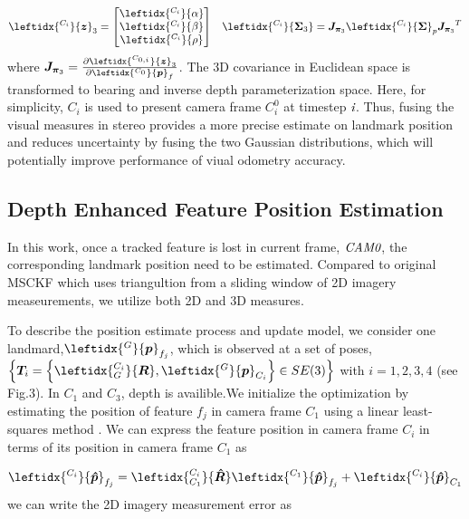\documentclass[a4paper, 10pt, conference]{ieeeconf}      %
\begin{document}
\begin{eqnarray}
\leftidx{^{C_{i}}}{ {\bm { z}}}_3 = \left[ \begin{matrix}  
\leftidx{^{C_{i}}}{ { \alpha}} \\
\leftidx{^{C_{i}}}{ { \beta}} \\
\leftidx{^{C_{i}}}{ { \rho}}
\end{matrix}\right] &&
\leftidx{^{C_i}}{\bm { \Sigma}_3} = {\bm J_{\bm \pi_3}} \leftidx{^{C_{i}}}{\bm { \Sigma}}_{p}{\bm J_{\bm \pi_3}}^T
\end{eqnarray}
where ${\bm J_{\bm \pi_3}} = \frac{\partial{\leftidx{^{C_{0,i}}}{\bm { z}}_3 }}{\partial{\leftidx{^{C_0}}{\bm { p}}_f}} $. The 3D covariance in Euclidean space is transformed to bearing and inverse depth parameterization space. Here,  for simplicity,  $ C_i $ is used to present camera frame $C_i^0 $ at timestep $ \emph i$.  Thus, fusing the visual measures in stereo provides a more precise  estimate on landmark position and reduces uncertainty by fusing the two Gaussian distributions, which will potentially improve performance of viual odometry accuracy. 


\subsection{Depth Enhanced Feature Position Estimation}

In this work, once a tracked feature is lost in current frame,  $  \emph {CAM0} $, the corresponding landmark position need to be estimated. Compared to original MSCKF which uses triangultion from a sliding window of 2D  imagery measeurements, we  utilize both  2D and  3D measures.

To describe the position estimate process and update model, we consider one landmard,$  \leftidx{^G}{\bm p}_{f_j} $, which is observed at a set of poses, $\left\lbrace \bm T_i = \left\lbrace  \leftidx{^{C_i}_{G}}{\bm R}, \leftidx{^{G}}{\bm p}_{C_i} \right\rbrace \in SE(3)  \right\rbrace $ with $ i = 1,2,3,4 $ (see Fig.3). In $ C_1$ and $ C_3 $, depth is availible.We initialize the optimization by estimating the position of feature $ f_j$ in camera frame $ C_1$ using a linear least-squares method \cite{clement2015battle}. We can express the feature position in camera frame $ C_i$
in terms of its position in camera frame $ C_1$  as

\begin{equation}
\leftidx{^{C_i}}{\bm {\hat p}}_{f_j} = \leftidx{^{C_i}_{C_1}}{\bm {\hat R}}\leftidx{^{C_1}}{\bm {\hat p}}_{f_j} + \leftidx{^{C_i}}{\bm { \hat p}}_{C_1}
\end{equation}
we can write the 2D imagery measurement error as
\end{document}
